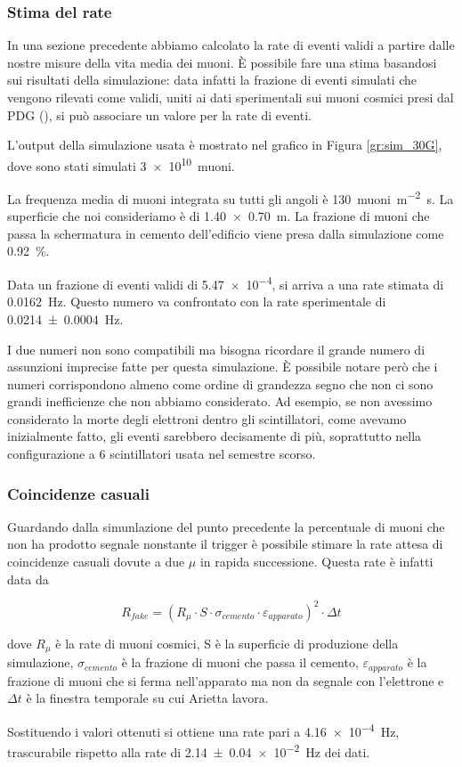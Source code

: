 \subsubsection{Stima del rate}
In una sezione precedente abbiamo calcolato la rate di eventi validi a partire dalle nostre misure della vita media dei muoni. 
\`E possibile fare una stima basandosi sui risultati della simulazione: data infatti la frazione di eventi simulati che vengono rilevati come validi, uniti ai dati sperimentali sui muoni cosmici presi dal PDG (\cite{bib:Patrignani:2016xqp}), si pu\`o associare un valore per la rate di eventi.

L'output della simulazione usata \`e mostrato nel grafico in Figura \ref{gr:sim_30G}, dove sono stati simulati \SI{3e10}{muoni}.

La frequenza media di muoni integrata su tutti gli angoli \`e \SI{130}{muoni\per\square\metre\second}. La superficie che noi consideriamo \`e di \SI{1.40 x 0.70}{\m}. 
La frazione di muoni che passa la schermatura in cemento dell'edificio viene presa dalla simulazione come \SI{0.92}{\percent}.

Data un frazione di eventi validi di \num{5.47e-4}, si arriva a una rate stimata di \SI{0.0162}{\Hz}. 
Questo numero va confrontato con la rate sperimentale di \SI{0.0214 +- 0.0004}{\Hz}.

I due numeri non sono compatibili ma bisogna ricordare il grande numero di assunzioni imprecise fatte per questa simulazione. 
\`E possibile notare per\`o che i numeri corrispondono almeno come ordine di grandezza segno che non ci sono grandi inefficienze che non abbiamo considerato. 
Ad esempio, se non avessimo considerato la morte degli elettroni dentro gli scintillatori, come avevamo inizialmente fatto, gli eventi sarebbero decisamente di pi\`u, soprattutto nella configurazione a 6 scintillatori usata nel semestre scorso.

\subsubsection{Coincidenze casuali}
Guardando dalla simunlazione del punto precedente la percentuale di muoni che non ha prodotto segnale nonstante il trigger \`e possibile stimare la rate attesa di coincidenze casuali dovute a due $\mu$ in rapida successione.
Questa rate \`e infatti data da

\begin{equation}
	R_{fake} = \left(R_\mu\cdot S\cdot\sigma_{cemento}\cdot\varepsilon_{apparato}\right)^2\cdot\Delta t
	\label{eq:fakes}
\end{equation}

dove $R_\mu$ \`e la rate di muoni cosmici, S \`e la superficie di produzione della simulazione, $\sigma_{cemento}$ \`e la frazione di muoni che passa il cemento, $\varepsilon_{apparato}$ \`e la frazione di muoni che si ferma nell'apparato ma non da segnale con l'elettrone e $\Delta t$ \`e la finestra temporale su cui Arietta lavora.

Sostituendo i valori ottenuti si ottiene una rate pari a \SI{4.16e-4}{\Hz}, trascurabile rispetto alla rate di \SI{2.14 +- 0.04e-2}{\Hz} dei dati.
